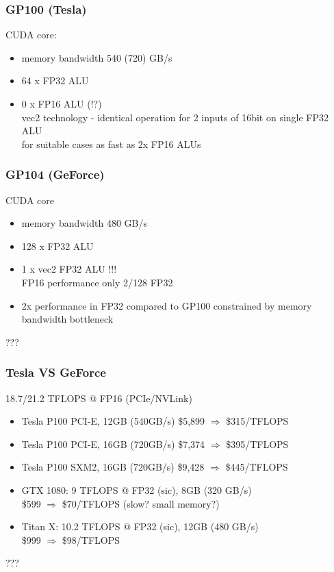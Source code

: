 \documentclass{beamer}
\begin{document}
			\begin{frame}
				\frametitle{GP100 (Tesla)}				
				CUDA core:
				\begin{itemize}
                    \item memory bandwidth 540 (720) GB/s
					\item 64 x FP32 ALU
					\item 0 x FP16 ALU (!?)\\
						vec2 technology - identical operation for 2 inputs of 16bit on single FP32 ALU\\
						for suitable cases as fast as 2x FP16 ALUs
				\end{itemize} 
			\end{frame}	
			
			\begin{frame}
				\frametitle{GP104 (GeForce)}
					CUDA core 
					\begin{itemize} 
                        \item memory bandwidth 480 GB/s
						\item 128 x FP32 ALU
						\item 1 x vec2 FP32 ALU !!!\\
							FP16 performance only 2/128 FP32
                        \item 2x performance in FP32 compared to GP100 constrained by memory bandwidth bottleneck
					\end{itemize} 
					\vspace{\baselineskip}
					???
			\end{frame}
			
			\begin{frame}
				\frametitle{Tesla VS GeForce}				
					
					18.7/21.2 TFLOPS @ FP16 (PCIe/NVLink)
					
					\begin{itemize} 
						\item Tesla P100 PCI-E, 12GB (540GB/s) \$5,899	$\Rightarrow$ \$315/TFLOPS
						\item Tesla P100 PCI-E, 16GB (720GB/s) \$7,374	$\Rightarrow$ \$395/TFLOPS
						\item Tesla P100 SXM2,  16GB (720GB/s) \$9,428	$\Rightarrow$ \$445/TFLOPS
					\end{itemize} 
			
					\begin{itemize} 
						\item GTX 1080: 9 TFLOPS @ FP32 (sic), 8GB (320 GB/s)\\
							\$599 $\Rightarrow$ \$70/TFLOPS (slow? small memory?)
						\item Titan X: 10.2 TFLOPS @ FP32 (sic), 12GB (480 GB/s)\\
							\$999 $\Rightarrow$ \$98/TFLOPS
					\end{itemize} 
					\vspace{\baselineskip} 
					???
			\end{frame}
			
\end{document}
